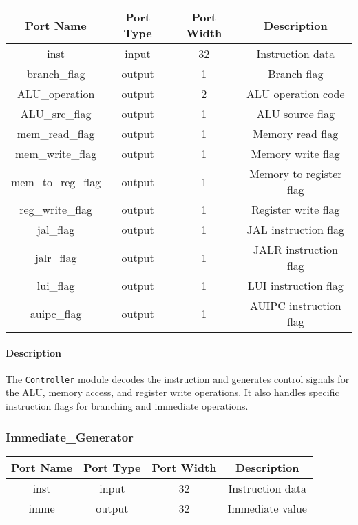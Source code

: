 \documentclass[a4paper,12pt]{article}
\begin{document}
\begin{center}
    \begin{tabular}{cccc}
        \toprule
        \textbf{Port Name} & \textbf{Port Type} & \textbf{Port Width} & \textbf{Description} \\
        \midrule
        inst                & input  & 32 & Instruction data \\
        branch\_flag        & output & 1  & Branch flag \\
        ALU\_operation      & output & 2  & ALU operation code \\
        ALU\_src\_flag      & output & 1  & ALU source flag \\
        mem\_read\_flag     & output & 1  & Memory read flag \\
        mem\_write\_flag    & output & 1  & Memory write flag \\
        mem\_to\_reg\_flag  & output & 1  & Memory to register flag \\
        reg\_write\_flag    & output & 1  & Register write flag \\
        jal\_flag           & output & 1  & JAL instruction flag \\
        jalr\_flag          & output & 1  & JALR instruction flag \\
        lui\_flag           & output & 1  & LUI instruction flag \\
        auipc\_flag         & output & 1  & AUIPC instruction flag \\
        \bottomrule
    \end{tabular}
\end{center}

\paragraph{Description}
The \texttt{Controller} module decodes the instruction and generates control signals for the ALU, memory access, and register write operations. It also handles specific instruction flags for branching and immediate operations.

\subsubsection{Immediate\_Generator}

\begin{center}
    \begin{tabular}{cccc}
        \toprule
        \textbf{Port Name} & \textbf{Port Type} & \textbf{Port Width} & \textbf{Description} \\
        \midrule
        inst & input  & 32 & Instruction data \\
        imme & output & 32 & Immediate value \\
        \bottomrule
    \end{tabular}
\end{center}
\end{document}
